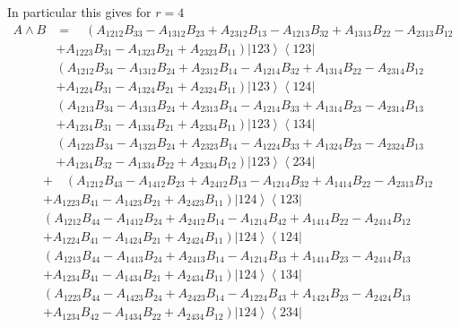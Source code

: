 \documentclass[aps,preprint]{revtex4}%
\begin{document}
In particular this gives for $r=4$%
\begin{align}
A\wedge B  &  =\quad\left(  A_{1212}B_{33}-A_{1312}B_{23}+A_{2312}%
B_{13}-A_{1213}B_{32}+A_{1313}B_{22}-A_{2313}B_{12}\right. \nonumber\\
&  \left.  +A_{1223}B_{31}-A_{1323}B_{21}+A_{2323}B_{11}\right)  \left\vert
123\right\rangle \left\langle 123\right\vert \nonumber\\
&  \left(  A_{1212}B_{34}-A_{1312}B_{24}+A_{2312}B_{14}-A_{1214}%
B_{32}+A_{1314}B_{22}-A_{2314}B_{12}\right. \nonumber\\
&  \left.  +A_{1224}B_{31}-A_{1324}B_{21}+A_{2324}B_{11}\right)  \left\vert
123\right\rangle \left\langle 124\right\vert \nonumber\\
&  \left(  A_{1213}B_{34}-A_{1313}B_{24}+A_{2313}B_{14}-A_{1214}%
B_{33}+A_{1314}B_{23}-A_{2314}B_{13}\right. \nonumber\\
&  \left.  +A_{1234}B_{31}-A_{1334}B_{21}+A_{2334}B_{11}\right)  \left\vert
123\right\rangle \left\langle 134\right\vert \nonumber\\
&  \left(  A_{1223}B_{34}-A_{1323}B_{24}+A_{2323}B_{14}-A_{1224}%
B_{33}+A_{1324}B_{23}-A_{2324}B_{13}\right. \nonumber\\
&  \left.  +A_{1234}B_{32}-A_{1334}B_{22}+A_{2334}B_{12}\right)  \left\vert
123\right\rangle \left\langle 234\right\vert
\end{align}%
\begin{align}
&  +\quad\left(  A_{1212}B_{43}-A_{1412}B_{23}+A_{2412}B_{13}-A_{1214}%
B_{32}+A_{1414}B_{22}-A_{2313}B_{12}\right. \nonumber\\
&  \left.  +A_{1223}B_{41}-A_{1423}B_{21}+A_{2423}B_{11}\right)  \left\vert
124\right\rangle \left\langle 123\right\vert \nonumber\\
&  \left(  A_{1212}B_{44}-A_{1412}B_{24}+A_{2412}B_{14}-A_{1214}%
B_{42}+A_{1414}B_{22}-A_{2414}B_{12}\right. \nonumber\\
&  \left.  +A_{1224}B_{41}-A_{1424}B_{21}+A_{2424}B_{11}\right)  \left\vert
124\right\rangle \left\langle 124\right\vert \nonumber\\
&  \left(  A_{1213}B_{44}-A_{1413}B_{24}+A_{2413}B_{14}-A_{1214}%
B_{43}+A_{1414}B_{23}-A_{2414}B_{13}\right. \nonumber\\
&  \left.  +A_{1234}B_{41}-A_{1434}B_{21}+A_{2434}B_{11}\right)  \left\vert
124\right\rangle \left\langle 134\right\vert \nonumber\\
&  \left(  A_{1223}B_{44}-A_{1423}B_{24}+A_{2423}B_{14}-A_{1224}%
B_{43}+A_{1424}B_{23}-A_{2424}B_{13}\right. \nonumber\\
&  \left.  +A_{1234}B_{42}-A_{1434}B_{22}+A_{2434}B_{12}\right)  \left\vert
124\right\rangle \left\langle 234\right\vert
\end{align}%
\end{document}
